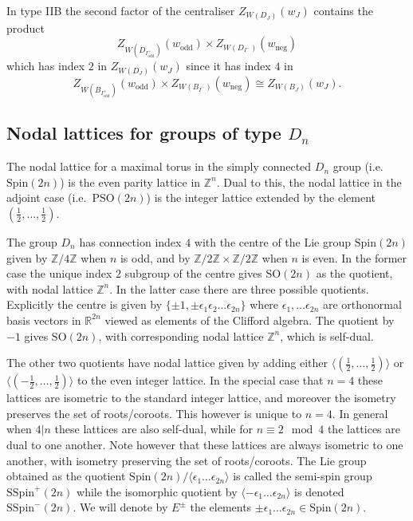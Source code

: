 \documentclass[11pt,a4paper]{article}
\def\SSpin{\mathrm{SSpin}}
\def\Spin{\mathrm{Spin}}
\def\SO{\mathrm{SO}}
\def\SSpin{\mathrm{SSpin}}
\def\R{\mathbb{R}}
\def\Z{\mathbb{Z}}
\def\odd{\mathrm{odd}}
\def\neg{\mathrm{neg}}
\begin{document}
    In type IIB the second factor of the centraliser $Z_{W(D_{J})}(w_{J})$ contains the product
    \[
    Z_{W(D_{I^+_{\odd}})}(w_{\odd})\times Z_{W(D_{I^-})}(w_\neg)
    \]
    which has index $2$ in $Z_{W(D_{J})}(w_{J})$ since it has index $4$ in
    \[
    Z_{W(B_{I^+_{\odd}})}(w_{\odd})\times Z_{W(B_{I^-})}(w_\neg)\cong Z_{W(B_{J})}(w_{J}).
    \]

    
        





\subsection{Nodal lattices for groups of type $D_n$}

The nodal lattice for a maximal torus in the simply connected $D_n$ group (i.e.\ $\mathrm{Spin}(2n)$) is the even parity lattice in $\Z^n$.  Dual to this, the nodal lattice in the adjoint case (i.e.\ $\mathrm{PSO}(2n)$) is the integer lattice extended by the element $(\frac 12,\dots,\frac 12)$.

The group $D_n$ has connection index $4$ with the centre of the Lie group  $\mathrm{Spin}(2n)$ given by $\Z/4\Z$ when $n$ is odd, and by $\Z/2\Z\times \Z/2\Z$ when $n$ is even. In the former case the unique index $2$ subgroup of the centre gives $\mathrm{SO}(2n)$ as the quotient, with nodal lattice $\Z^n$. In the latter case there are three possible quotients. Explicitly the centre is given by $\{\pm 1, \pm \epsilon_1\epsilon_2\dots \epsilon_{2n}\}$ where $\epsilon_1,\dots \epsilon_{2n}$ are orthonormal basis vectors in $\R^{2n}$ viewed as elements of the Clifford algebra.  The quotient by $-1$ gives $\SO(2n)$, with corresponding nodal lattice $\Z^n$, which is self-dual.

The other two quotients have nodal lattice given by adding either $\langle (\frac 12, \dots ,\frac 12)\rangle$ or $\langle (-\frac 12, \dots ,\frac 12)\rangle$ to the even integer lattice. In the special case that $n=4$ these lattices are isometric to the standard integer lattice, and moreover the isometry preserves the set of roots/coroots. This however is unique to $n=4$. In general when $4|n$ these lattices are also self-dual, while for $n\equiv 2 \mod 4$ the lattices are dual to one another. Note however that these lattices are always isometric to one another, with isometry preserving the set of roots/coroots. The Lie group obtained as the quotient $\Spin(2n) / \langle \epsilon_1 \dots\epsilon_{2n}\rangle$ is called the semi-spin group $\SSpin^+(2n)$ while the isomorphic quotient by $\langle -\epsilon_1 \dots\epsilon_{2n}\rangle$ is denoted  $\SSpin^-(2n)$. We will denote by $E^\pm$ the elements $\pm\epsilon_1 \dots\epsilon_{2n}\in \Spin(2n)$.
\end{document}
